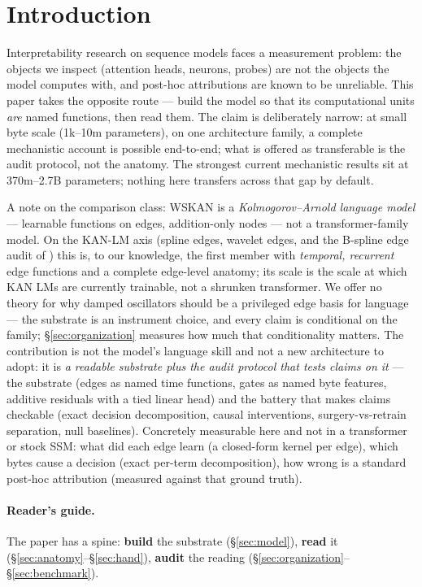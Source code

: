 \documentclass[11pt]{article}
\newcommand{\wskan}{WSKAN}
\begin{document}
\section{Introduction}

Interpretability research on sequence models faces a measurement problem:
the objects we inspect (attention heads, neurons, probes) are not the
objects the model computes with, and post-hoc attributions are known to be
unreliable. This paper takes the opposite route --- build the model so
that its computational units \emph{are} named functions, then read them.
The claim is deliberately narrow: at small byte scale (1k--10m
parameters), on one architecture family, a complete mechanistic account
is possible end-to-end; what is offered as transferable is the audit
protocol, not the anatomy. The strongest current mechanistic results sit
at 370m--2.7B parameters; nothing here transfers across that gap by
default.

A note on the comparison class: \wskan{} is a \emph{Kolmogorov--Arnold
language model} --- learnable functions on edges, addition-only nodes ---
not a transformer-family model. On the KAN-LM axis (spline edges, wavelet
edges, and the B-spline edge audit of \cite{kan-lm-audit}) this is, to our
knowledge, the first member with \emph{temporal, recurrent} edge functions
and a complete
edge-level anatomy; its scale is the scale at which KAN LMs are currently
trainable, not a shrunken transformer. We offer no theory for why damped
oscillators should be a privileged edge basis for language --- the
substrate is an instrument choice, and every claim is conditional on the
family; \S\ref{sec:organization} measures how much that conditionality
matters.
The contribution is not the model's language skill and not a new
architecture to adopt: it is \emph{a readable substrate plus the audit
protocol that tests claims on it} --- the substrate (edges as named time
functions, gates as named byte features, additive residuals with a tied
linear head) and the battery that makes claims checkable (exact decision
decomposition, causal interventions, surgery-vs-retrain separation, null
baselines). Concretely measurable here and not in a transformer or
stock SSM: what did each edge learn (a closed-form kernel per edge), which
bytes cause a decision (exact per-term decomposition), how wrong is a
standard post-hoc attribution (measured against that ground truth).

\paragraph{Reader's guide.}
The paper has a spine: \textbf{build} the substrate (\S\ref{sec:model}),
\textbf{read} it (\S\ref{sec:anatomy}--\S\ref{sec:hand}), \textbf{audit}
the reading (\S\ref{sec:organization}--\S\ref{sec:benchmark}).
\end{document}

